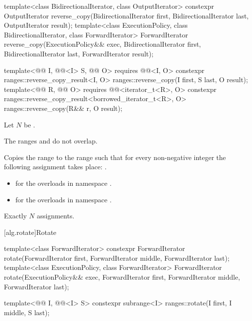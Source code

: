 %
\begin{itemdecl}
template<class BidirectionalIterator, class OutputIterator>
  constexpr OutputIterator
    reverse_copy(BidirectionalIterator first, BidirectionalIterator last,
                 OutputIterator result);
template<class ExecutionPolicy, class BidirectionalIterator, class ForwardIterator>
  ForwardIterator
    reverse_copy(ExecutionPolicy&& exec,
                 BidirectionalIterator first, BidirectionalIterator last,
                 ForwardIterator result);

template<@@ I, @@<I> S, @@ O>
  requires @@<I, O>
  constexpr ranges::reverse_copy_result<I, O>
    ranges::reverse_copy(I first, S last, O result);
template<@@ R, @@ O>
  requires @@<iterator_t<R>, O>
  constexpr ranges::reverse_copy_result<borrowed_iterator_t<R>, O>
    ranges::reverse_copy(R&& r, O result);
\end{itemdecl}

\begin{itemdescr}
\pnum
Let $N$ be .

\pnum
\expects
The ranges  and 
do not overlap.

\pnum
\effects
Copies the range  to the range 
such that for every non-negative integer 
the following assignment takes place:
.

\pnum
\returns
\begin{itemize}
\item
   for the overloads in namespace .
\item
   for the overloads in namespace .
\end{itemize}

\pnum
\complexity
Exactly $N$ assignments.
\end{itemdescr}

[alg.rotate]{Rotate}

%
\begin{itemdecl}
template<class ForwardIterator>
  constexpr ForwardIterator
    rotate(ForwardIterator first, ForwardIterator middle, ForwardIterator last);
template<class ExecutionPolicy, class ForwardIterator>
  ForwardIterator
    rotate(ExecutionPolicy&& exec,
           ForwardIterator first, ForwardIterator middle, ForwardIterator last);

template<@@ I, @@<I> S>
  constexpr subrange<I> ranges::rotate(I first, I middle, S last);
\end{itemdecl}

